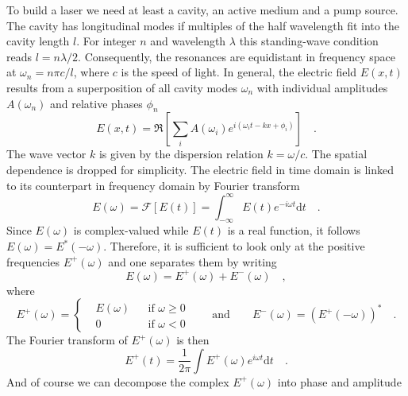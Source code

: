 To build a laser we need at least a cavity, an active medium and a pump source. The cavity has longitudinal modes if multiples of the half wavelength fit into the cavity length $l$. For integer $n$ and wavelength $\lambda$ this standing-wave condition reads ${l = n\lambda/2}$. Consequently, the resonances are equidistant in frequency space at $\omega_{n} = n\pi c/l$, where $c$ is the speed of light.  
In general, the electric field $E(x,t)$ results from a superposition of all cavity modes $\omega_{n}$ with individual amplitudes $A(\omega_{n})$ and relative phases $\phi_{n}$
\begin{equation}
	E(x,t) = \Re \left[ \sum_{i} A(\omega_{i}) e^{i (\omega_{i} t - k x + \phi_{i})} \right] \quad .
\end{equation}
The wave vector $k$ is given by the dispersion relation $k=\omega/c$.
The spatial dependence is dropped for simplicity. The electric field in time domain is linked to its counterpart in frequency domain by Fourier transform
\begin{equation}
	E(\omega) = \mathcal{F}[E(t)] = \int_{-\infty}^{\infty} E(t) e^{- i \omega t} \text{d}t \quad .
\end{equation}
Since $E(\omega)$ is complex-valued while $E(t)$ is a real function, it follows $E(\omega) = E^{*}(-\omega)$. Therefore, it is sufficient to look only at the positive frequencies $E^{+}(\omega)$ and  one separates them by writing
\begin{equation}
	E(\omega) = E^{+}(\omega) + E^{-}(\omega) \quad ,
\end{equation}
where
\begin{equation}
	E^{+}(\omega) = \left \{ 
	\begin{aligned}
		& E(\omega) &&\text{if } \omega \geq 0 \\
		& 0 && \text{if } \omega < 0
	\end{aligned} \right.
	\qquad \text{and} \qquad
	E^{-}(\omega) = (E^{+}(-\omega))^{*} \quad .
\end{equation}
The Fourier transform of $E^{+}(\omega)$ is then
\begin{equation}
	E^{+}(t) = \frac{1}{2\pi} \int E^{+}(\omega) e^{ i \omega t} \text{d}t \quad .
\end{equation}
And of course we can decompose the complex $E^{+}(\omega)$  into phase and amplitude

